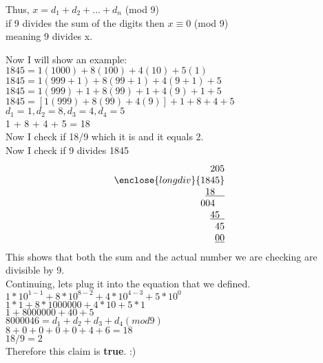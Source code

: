 \documentclass[10pt, AMS Euler]{article}
\begin{document}
Thus, $x = d_{1} + d_{2} +...+ d_{n}$ (mod 9) \\
if 9 divides the sum of the digits then $x \equiv 0$ (mod 9) \\
meaning 9 divides x.

Now I will show an example: \\
$1845 = 1(1000)+8(100)+4(10)+5(1)$ \\
$1845 = 1(999+1)+8(99+1)+4(9+1)+5$ \\
$1845 = 1(999)+1+8(99)+1+4(9)+1+5$ \\
$1845 = [1(999)+8(99)+4(9)]+1+8+4+5$ \\

$d_{1} = 1, d_{2} = 8, d_{3} = 4, d_{4} = 5$ \\
1 + 8 + 4 + 5 = 18 \\

Now I check if 18/9 which it is and it equals 2. \\
Now I check if 9 divides 1845 \\

$$\begin{array}{rll}
    205 & & \\
    \enclose{longdiv}{1845} & & \\
    \underline{18\phantom{00}} & & \\
     004\phantom{00} & & \\
    \underline{45\phantom{0}} & & \\
    45 & & \\
    \underline{00} & &
\end{array}$$
This shows that both the sum and the actual number we are checking are divisible by 9.  \\

Continuing, lets plug it into the equation that we defined. \\
$1*10^{1-1}+8*10^{8-2}+4*10^{4-3}+5*10^{0}$ \\
$1*1+8*1000000+4*10+5*1$ \\
$1+8000000+40+5$ \\
$8000046 = d_{1}+d_{2}+d_{3}+d_{4} (mod 9)$ \\
$8+0+0+0+0+4+6 = 18$ \\
$18/9 = 2$\\

Therefore this claim is \textbf{true}. :)\\
\end{document}
